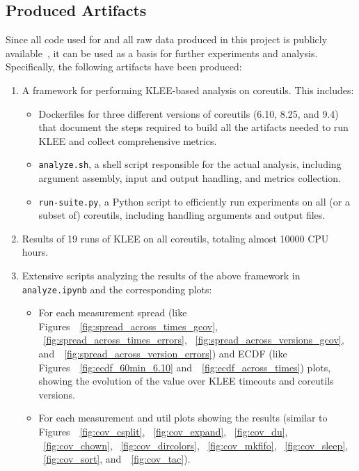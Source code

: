 \documentclass{article}
\let\savedCite=\cite
\renewcommand{\cite}{\unskip~\savedCite}
\let\savedRef=\ref
\renewcommand{\ref}{\unskip~\savedRef}
\begin{document}
\subsection{Produced Artifacts}

Since all code used for and all raw data produced in this project is publicly available\cite{GitHub}, it can be used as a basis for further experiments and analysis. Specifically, the following artifacts have been produced:
\begin{enumerate}
    \item A framework for performing KLEE-based analysis on coreutils. This includes:
          \begin{itemize}
              \item Dockerfiles for three different versions of coreutils (6.10, 8.25, and 9.4) that document the steps required to build all the artifacts needed to run KLEE and collect comprehensive metrics.
              \item \lstinline{analyze.sh}, a shell script responsible for the actual analysis, including argument assembly, input and output handling, and metrics collection.
              \item \lstinline{run-suite.py}, a Python script to efficiently run experiments on all (or a subset of) coreutils, including handling arguments and output files.
          \end{itemize}
    \item Results of 19 runs of KLEE on all coreutils, totaling almost 10000 CPU hours.
    \item Extensive scripts analyzing the results of the above framework in \lstinline{analyze.ipynb} and the corresponding plots:
          \begin{itemize}
              \item For each measurement spread (like Figures~\ref{fig:spread_across_times_gcov}, \ref{fig:spread_across_times_errors}, \ref{fig:spread_across_versions_gcov}, and~\ref{fig:spread_across_version_errors}) and ECDF (like Figures~\ref{fig:ecdf_60min_6.10} and~\ref{fig:ecdf_across_times}) plots, showing the evolution of the value over KLEE timeouts and coreutils versions.
              \item For each measurement and util plots showing the results (similar to Figures~\ref{fig:cov_csplit}, \ref{fig:cov_expand}, \ref{fig:cov_du}, \ref{fig:cov_chown}, \ref{fig:cov_dircolors}, \ref{fig:cov_mkfifo}, \ref{fig:cov_sleep}, \ref{fig:cov_sort}, and~\ref{fig:cov_tac}).
          \end{itemize}
\end{enumerate}
\end{document}
